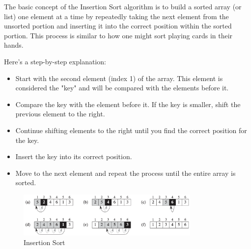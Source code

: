 

\begin{definitionblock}
The basic concept of the Insertion Sort algorithm is to build a sorted array (or list) one element at a time by repeatedly taking the next element from the unsorted portion and inserting it into the correct position within the sorted portion. This process is similar to how one might sort playing cards in their hands.
\end{definitionblock}

Here's a step-by-step explanation:

\begin{itemize}
    \item Start with the second element (index 1) of the array. This element is considered the "key" and will be compared with the elements before it.
    \item Compare the key with the element before it. If the key is smaller, shift the previous element to the right.
    \item Continue shifting elements to the right until you find the correct position for the key.
    \item Insert the key into its correct position.
    \item Move to the next element and repeat the process until the entire array is sorted.
\end{itemize}

\begin{figure}[H]
    \centering
    \includegraphics[width=0.8\textwidth]{assets/insertion_sort.png}
    \caption{Insertion Sort \cite{cormen2022introduction}}
\end{figure}

